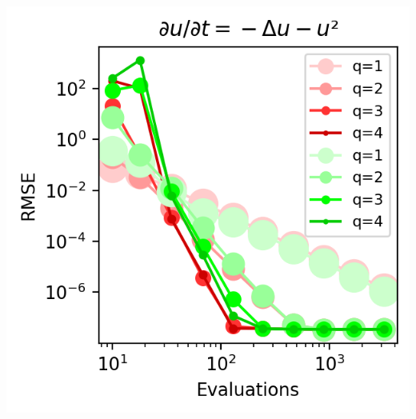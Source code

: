 \begin{center}
    \includegraphics[width=\columnwidth]{../images/solver_heat and big square.png}
    \label{fig:heat big}
\end{center}
